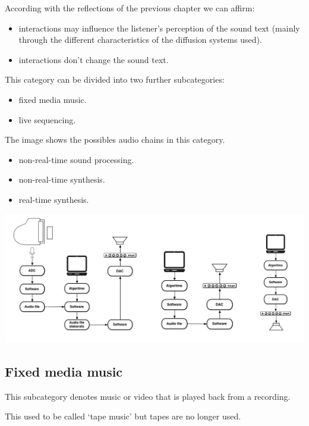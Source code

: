 According with the reflections of the previous chapter we can affirm:

\begin{itemize}
\tightlist
\item interactions may influence the listener's perception of the sound text (mainly through the different characteristics of the diffusion systems used).
\item interactions don't change the sound text.
\end{itemize}

This category can be divided into two further subcategories:

\begin{itemize}
\tightlist
\item fixed media music.
\item live sequencing.
\end{itemize}

The image shows the possibles audio chains in this category.

\begin{itemize}
\tightlist
\item non-real-time sound processing.
\item non-real-time synthesis.
\item real-time synthesis.
\end{itemize}

\begin{center}
\includegraphics[scale=1]{../img/chains.png}
\end{center}

\subsection{Fixed media music }\label{fixed-media-music}

This subcategory denotes music or video that is played back from a recording.

This used to be called `tape music' but tapes are no longer used.

